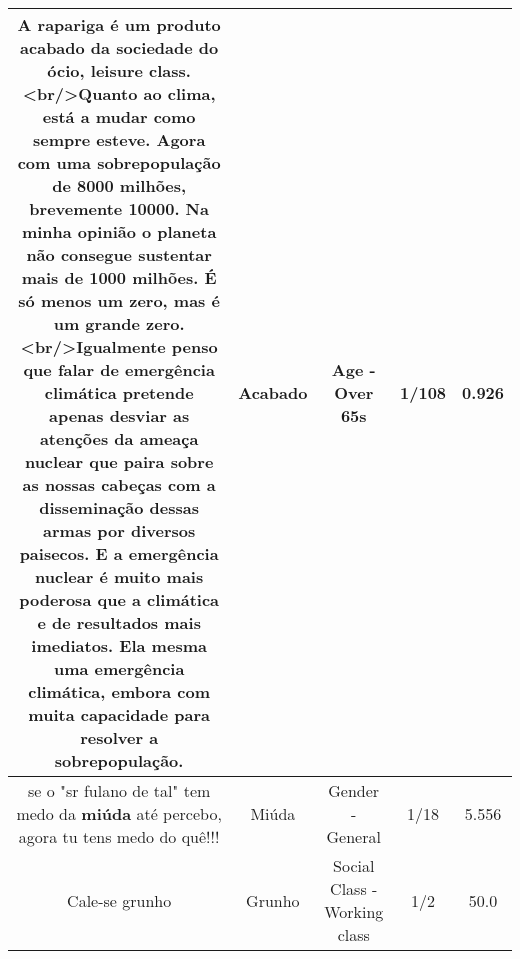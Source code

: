\documentclass[11pt]{article}
\newlength\mylength
\begin{document}
\begin{center}
\begin{longtable}{|C{.65\mylength}|C{.30\mylength}|C{.12\mylength}|C{.12\mylength}|C{.12\mylength}|}
  \small A rapariga é um produto \textbf{acabado} da sociedade do ócio, leisure class.<br/>Quanto ao clima, está a mudar como sempre esteve. Agora com uma sobrepopulação de 8000 milhões, brevemente 10000. Na minha opinião o planeta não consegue sustentar mais de 1000 milhões. É só menos um zero, mas é um grande zero.<br/>Igualmente penso que falar de emergência climática pretende apenas desviar as atenções da ameaça nuclear que paira sobre as nossas cabeças com a disseminação dessas armas por diversos paisecos. E a emergência nuclear é muito mais poderosa que a climática e de resultados mais imediatos. Ela mesma uma emergência climática, embora com muita capacidade para resolver a sobrepopulação.\normalsize   & Acabado & Age - Over 65s & 1/108 & 0.926 \\  \hline
  \small se o "sr fulano de tal" tem medo da \textbf{miúda} até percebo, agora tu tens medo do quê!!!\normalsize   & Miúda & Gender - General & 1/18 & 5.556 \\  \hline
  \small Cale-se grunho\normalsize   & Grunho & Social Class - Working class & 1/2 & 50.0 \\  \hline
  
\end{longtable}
\end{center}
\end{document}
